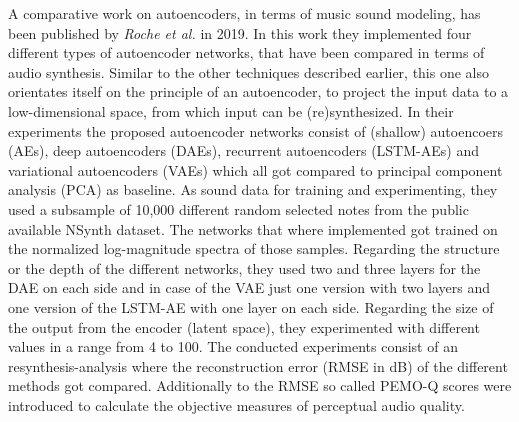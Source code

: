 A comparative work on autoencoders, in terms of music sound modeling, has been published by \textit{Roche et al.} in 2019. \cite{roche2019autoencoders} In this work they implemented four different types of autoencoder networks, that have been compared in terms of audio synthesis. Similar to the other techniques described earlier, this one also orientates itself on the principle of an autoencoder, to project the input data to a low-dimensional space, from which input can be (re)synthesized. In their experiments the proposed autoencoder networks consist of (shallow) autoencoers (AEs), deep autoencoders (DAEs), recurrent autoencoders (LSTM-AEs) and variational autoencoders (VAEs) which all got compared to principal component analysis (PCA) as baseline. As sound data for training and experimenting, they used a subsample of 10,000 different random selected notes from the public available NSynth dataset. The networks that where implemented got trained on the normalized log-magnitude spectra of those samples. Regarding the structure or the depth of the different networks, they used two and three layers for the DAE on each side and in case of the VAE just one version with two layers and one version of the LSTM-AE with one layer on each side. Regarding the size of the output from the encoder (latent space), they experimented with different values in a range from 4 to 100. The conducted experiments consist of an resynthesis-analysis where the reconstruction error (RMSE in dB) of the different methods got compared. Additionally to the RMSE so called PEMO-Q scores were introduced to calculate the objective measures of perceptual audio quality.\\
